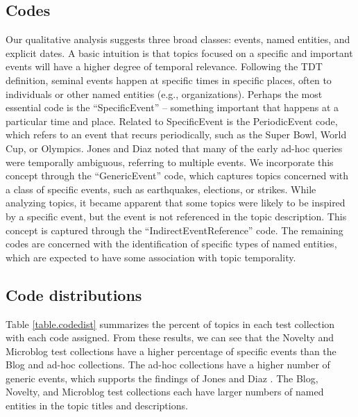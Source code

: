 \documentclass[runningheads,a4paper]{llncs}
\begin{document}
\subsection{Codes}

Our qualitative analysis suggests three broad classes: events, named entities, and explicit dates. A basic intuition is that topics focused on a specific and important events will have a higher degree of temporal relevance. Following the TDT definition, seminal events happen at specific times in specific places, often to individuals or other named entities (e.g., organizations). Perhaps the most essential code is the ``SpecificEvent'' -- something important that happens at a particular time and place. Related to SpecificEvent is the PeriodicEvent code, which refers to an event that recurs periodically, such as the Super Bowl, World Cup, or Olympics. Jones and Diaz \cite{Jones2007} noted that many of the early ad-hoc queries were temporally ambiguous, referring to multiple events. We incorporate this concept through the ``GenericEvent'' code, which captures topics concerned with a class of specific events, such as earthquakes, elections, or strikes. While analyzing topics, it became apparent that some topics were likely to be inspired by a specific event, but the event is not referenced in the topic description. This concept is captured through the ``IndirectEventReference'' code. The remaining codes are concerned with the identification of specific types of named entities, which are expected to have some  association with topic temporality.


\subsection{Code distributions}

Table \ref{table.codedist} summarizes the percent of topics in each test collection with each code assigned. From these results, we can see that the Novelty and Microblog test collections have a higher percentage of specific events than the Blog and ad-hoc collections. The ad-hoc collections have a higher number of generic events, which supports the findings of Jones and Diaz \cite{Jones2007}. The Blog, Novelty, and Microblog test collections each have larger numbers of named entities in the topic titles and descriptions.
\end{document}
